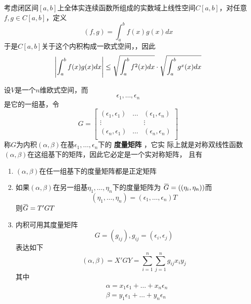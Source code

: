 \documentclass[11pt]{article}
\begin{document}
\begin{examplle}[]
考虑闭区间\([a,b]\)上全体实连续函数所组成的实数域上线性空间\(C[a,b]\)，对任意
\(f,g\in C[a,b]\)，定义
\begin{equation*}
(f,g)=\int_a^bf(x)g(x)dx
\end{equation*}
于是\(C[a,b]\)关于这个内积构成一欧式空间，，因此
\begin{equation*}
 \abs{\int_a^bf(x)g(x)dx}\le\sqrt{\int_a^bf^2(x)dx}\cdot\sqrt{\int_a^bg^x(x)dx}
\end{equation*}
\end{examplle}

设\(V\)是一个\(n\)维欧式空间，而
\begin{equation*}
\epsilon_1,\dots,\epsilon_n
\end{equation*}
是它的一组基，令
\begin{equation*}
G=
\begin{bmatrix}
(\epsilon_1,\epsilon_1)&\dots&(\epsilon_1,\epsilon_n)\\
\vdots&&\vdots\\
(\epsilon_n,\epsilon_1)&\dots&(\epsilon_n,\epsilon_n)\\
\end{bmatrix}
\end{equation*}
称\(G\)为内积\((\alpha,\beta)\)在基\(\epsilon_1,\dots,\epsilon_n\)下的 \textbf{度量矩阵} ，它实
际上就是对称双线性函数\((\alpha,\beta)\)在这组基下的矩阵，因此它必定是一个实对称矩阵，
且有
\begin{enumerate}
\item \((\alpha,\beta)\)在任一组基下的度量矩阵都是正定矩阵
\item 如果\((\alpha,\beta)\)在另一组基\(\eta_1,\dots,\eta_n\)下的度量矩阵为
\(\bbar{G}=((\eta_i,\eta_n))\)而
\begin{equation*}
(\eta_1,\dots,\eta_n)=(\epsilon_1,\dots,\epsilon_n)T
\end{equation*}
则\(\bbar{G}=T'GT\)
\item 内积可用其度量矩阵
\begin{equation*}
G=(g_{ij}),g_{ij}=(\epsilon_i,\epsilon_j)
\end{equation*}
表达如下
\begin{equation*}
(\alpha,\beta)=X'GY=\sum_{i=1}^n\sum_{j=1}^ng_{ij}x_iy_j
\end{equation*}
其中
\begin{align*}
&\alpha=x_1\epsilon_1+\dots+x_n\epsilon_n\\
&\beta=y_1\epsilon_1+\dots+y_n\epsilon_n
\end{align*}
\end{enumerate}
\end{document}
